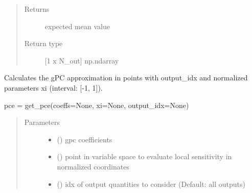 \documentclass[letterpaper,10pt,english,openany,oneside]{sphinxmanual}
\begin{document}
\begin{fulllineitems}
\begin{fulllineitems}
\begin{quote}
\begin{description}
\item[{Returns}] \leavevmode
{} \textendash{} expected mean value

\item[{Return type}] \leavevmode
{[}1 x N\_out{]} np.ndarray

\end{description}\end{quote}

\end{fulllineitems}


\begin{fulllineitems}
\label{\detokenize{pygpc:pygpc.gpc.gPC.get_approximation}}
Calculates the gPC approximation in points with output\_idx and normalized parameters xi (interval: {[}-1, 1{]}).

pce = get\_pce(coeffs=None, xi=None, output\_idx=None)
\begin{quote}\begin{description}
\item[{Parameters}] \leavevmode\begin{itemize}
\item {} 
 (\sphinxstyleliteralemphasis{\sphinxupquote{{[}}}\sphinxstyleliteralemphasis{\sphinxupquote{{]} }}\sphinxstyleliteralemphasis{\sphinxupquote{, }}\sphinxstyleliteralemphasis{\sphinxupquote{, }}) \textendash{} gpc coefficients

\item {} 
 (\sphinxstyleliteralemphasis{\sphinxupquote{{[}}}\sphinxstyleliteralemphasis{\sphinxupquote{{]} }}\sphinxstyleliteralemphasis{\sphinxupquote{, }}\sphinxstyleliteralemphasis{\sphinxupquote{, }}) \textendash{} point in variable space to evaluate local sensitivity in normalized coordinates

\item {} 
 (\sphinxstyleliteralemphasis{\sphinxupquote{{[}}}\sphinxstyleliteralemphasis{\sphinxupquote{{]} }}\sphinxstyleliteralemphasis{\sphinxupquote{, }}\sphinxstyleliteralemphasis{\sphinxupquote{, }}) \textendash{} idx of output quantities to consider (Default: all outputs)


\end{itemize}
\end{description}
\end{quote}
\end{fulllineitems}
\end{fulllineitems}
\end{document}
